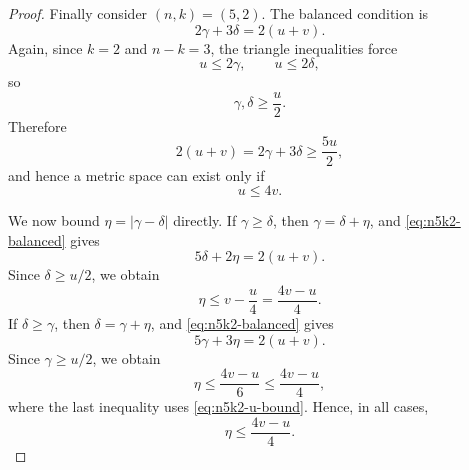 \documentclass[11pt]{amsart}
\numberwithin{equation}{section}
\theoremstyle{definition}
\theoremstyle{remark}
\begin{document}
\begin{proof}
Finally consider \((n,k)=(5,2)\).  The balanced condition is
\begin{equation}\label{eq:n5k2-balanced}
2\gamma+3\delta=2(u+v).
\end{equation}
Again, since \(k=2\) and \(n-k=3\), the triangle inequalities force
\begin{equation}\label{eq:n5k2-lower-bounds}
u\leq 2\gamma,
\qquad
u\leq 2\delta,
\end{equation}
so
\begin{equation}\label{eq:n5k2-gamma-delta-lower}
\gamma,\delta\geq \frac{u}{2}.
\end{equation}
Therefore
\begin{equation}\label{eq:n5k2-necessary}
2(u+v)=2\gamma+3\delta\geq \frac{5u}{2},
\end{equation}
and hence a metric space can exist only if
\begin{equation}\label{eq:n5k2-u-bound}
u\leq 4v.
\end{equation}

We now bound \(\eta=|\gamma-\delta|\) directly.  If \(\gamma\geq \delta\),
then \(\gamma=\delta+\eta\), and \eqref{eq:n5k2-balanced} gives
\begin{equation}\label{eq:n5k2-case-one-delta}
5\delta+2\eta=2(u+v).
\end{equation}
Since \(\delta\geq u/2\), we obtain
\begin{equation}\label{eq:n5k2-case-one-eta}
\eta\leq v-\frac{u}{4}
=
\frac{4v-u}{4}.
\end{equation}
If \(\delta\geq \gamma\), then \(\delta=\gamma+\eta\), and
\eqref{eq:n5k2-balanced} gives
\begin{equation}\label{eq:n5k2-case-two-gamma}
5\gamma+3\eta=2(u+v).
\end{equation}
Since \(\gamma\geq u/2\), we obtain
\begin{equation}\label{eq:n5k2-case-two-eta}
\eta\leq \frac{4v-u}{6}
\leq
\frac{4v-u}{4},
\end{equation}
where the last inequality uses \eqref{eq:n5k2-u-bound}.  Hence, in all cases,
\begin{equation}\label{eq:n5k2-eta-bound}
\eta\leq \frac{4v-u}{4}.
\end{equation}


\end{proof}
\end{document}
